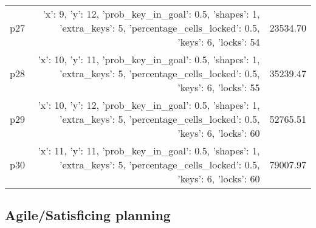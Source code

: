\documentclass{article}
\begin{document}
\begin{center}
\begin{tabular}{@{}l|r|r@{}}
  p27&{'x': 9, 'y': 12, 'prob\_key\_in\_goal': 0.5, 'shapes': 1, 'extra\_keys': 5, 'percentage\_cells\_locked': 0.5, 'keys': 6, 'locks': 54}&23534.70\\
  p28&{'x': 10, 'y': 11, 'prob\_key\_in\_goal': 0.5, 'shapes': 1, 'extra\_keys': 5, 'percentage\_cells\_locked': 0.5, 'keys': 6, 'locks': 55}&35239.47\\
  p29&{'x': 10, 'y': 12, 'prob\_key\_in\_goal': 0.5, 'shapes': 1, 'extra\_keys': 5, 'percentage\_cells\_locked': 0.5, 'keys': 6, 'locks': 60}&52765.51\\
  p30&{'x': 11, 'y': 11, 'prob\_key\_in\_goal': 0.5, 'shapes': 1, 'extra\_keys': 5, 'percentage\_cells\_locked': 0.5, 'keys': 6, 'locks': 60}&79007.97
                            \end{tabular}
                            \end{center}
                    

                                \subsection*{Agile/Satisficing planning}
                                
\end{document}
